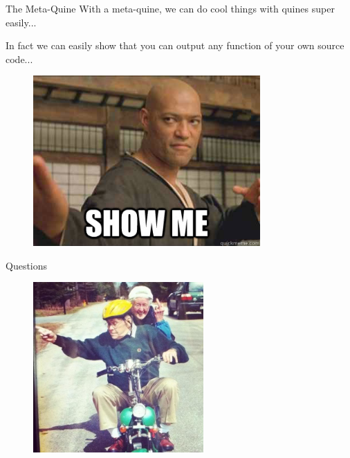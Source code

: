 \documentclass[pdf,14pt]{beamer}
\begin{document}
\begin{frame}{The Meta-Quine}
  With a meta-quine, we can do cool things with quines super easily...

  \pause

  In fact we can easily show that you can output any function
  of your own source code...
\end{frame}

\begin{frame}
  \begin{figure}[ht]
    \begin{center}
      \includegraphics[height=6.5cm]{showme.jpeg}
    \end{center}
  \end{figure}  
\end{frame}

\begin{frame}{Questions}
  \begin{figure}[ht]
    \begin{center}
      \includegraphics[height=6.5cm]{old.jpeg}
    \end{center}
  \end{figure}  
\end{frame}
\end{document}
